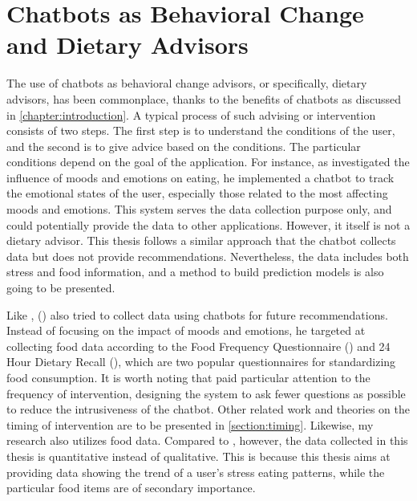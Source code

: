 \section{Chatbots as Behavioral Change and Dietary Advisors}
The use of chatbots as behavioral change advisors, or specifically, dietary advisors, has been commonplace, thanks to the benefits of chatbots as discussed in \autoref{chapter:introduction}. A typical process of such advising or intervention consists of two steps. The first step is to understand the conditions of the user, and the second is to give advice based on the conditions. The particular conditions depend on the goal of the application. For instance, as \citeauthor{16_martin} investigated the influence of moods and emotions on eating, he implemented a chatbot to track the emotional states of the user, especially those related to the most affecting moods and emotions. This system serves the data collection purpose only, and could potentially provide the data to other applications. However, it itself is not a dietary advisor. This thesis follows a similar approach that the chatbot collects data but does not provide recommendations. Nevertheless, the data includes both stress and food information, and a method to build prediction models is also going to be presented. \bigskip

\noindent Like \citeauthor{16_martin}, \citeauthor{17_ludwig} (\citeyear{17_ludwig}) also tried to collect data using chatbots for future recommendations. Instead of focusing on the impact of moods and emotions, he targeted at collecting food data according to the Food Frequency Questionnaire (\cite{49_ffq}) and 24 Hour Dietary Recall (\cite{50_24hr}), which are two popular questionnaires for standardizing food consumption. It is worth noting that \citeauthor{17_ludwig} paid particular attention to the frequency of intervention, designing the system to ask fewer questions as possible to reduce the intrusiveness of the chatbot. Other related work and theories on the timing of intervention are to be presented in \autoref{section:timing}. Likewise, my research also utilizes food data. Compared to \citeauthor{17_ludwig}, however, the data collected in this thesis is quantitative instead of qualitative. This is because this thesis aims at providing data showing the trend of a user's stress eating patterns, while the particular food items are of secondary importance.\bigskip

